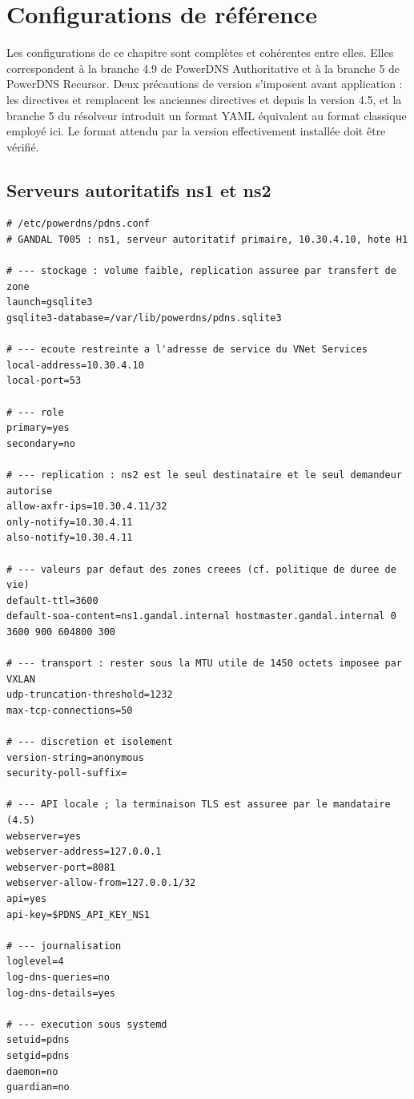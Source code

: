 \chapter{Configurations de référence}
\label{ch:configurations}

Les configurations de ce chapitre sont complètes et cohérentes entre elles.
Elles correspondent à la branche 4.9 de PowerDNS Authoritative et à la branche 5
de PowerDNS Recursor. Deux précautions de version s'imposent avant application :
les directives  et  remplacent les anciennes
directives  et  depuis la version 4.5, et la branche 5 du
résolveur introduit un format YAML équivalent au format classique employé ici.
Le format attendu par la version effectivement installée doit être vérifié.

\section{Serveurs autoritatifs ns1 et ns2}
\label{sec:autoritatifs}

\begin{lstlisting}[language=pdnsconf,caption={Configuration du serveur
  autoritatif primaire ns1},label=lst:ns1]
# /etc/powerdns/pdns.conf
# GANDAL T005 : ns1, serveur autoritatif primaire, 10.30.4.10, hote H1

# --- stockage : volume faible, replication assuree par transfert de zone
launch=gsqlite3
gsqlite3-database=/var/lib/powerdns/pdns.sqlite3

# --- ecoute restreinte a l'adresse de service du VNet Services
local-address=10.30.4.10
local-port=53

# --- role
primary=yes
secondary=no

# --- replication : ns2 est le seul destinataire et le seul demandeur autorise
allow-axfr-ips=10.30.4.11/32
only-notify=10.30.4.11
also-notify=10.30.4.11

# --- valeurs par defaut des zones creees (cf. politique de duree de vie)
default-ttl=3600
default-soa-content=ns1.gandal.internal hostmaster.gandal.internal 0 3600 900 604800 300

# --- transport : rester sous la MTU utile de 1450 octets imposee par VXLAN
udp-truncation-threshold=1232
max-tcp-connections=50

# --- discretion et isolement
version-string=anonymous
security-poll-suffix=

# --- API locale ; la terminaison TLS est assuree par le mandataire (4.5)
webserver=yes
webserver-address=127.0.0.1
webserver-port=8081
webserver-allow-from=127.0.0.1/32
api=yes
api-key=$PDNS_API_KEY_NS1

# --- journalisation
loglevel=4
log-dns-queries=no
log-dns-details=yes

# --- execution sous systemd
setuid=pdns
setgid=pdns
daemon=no
guardian=no
\end{lstlisting}

